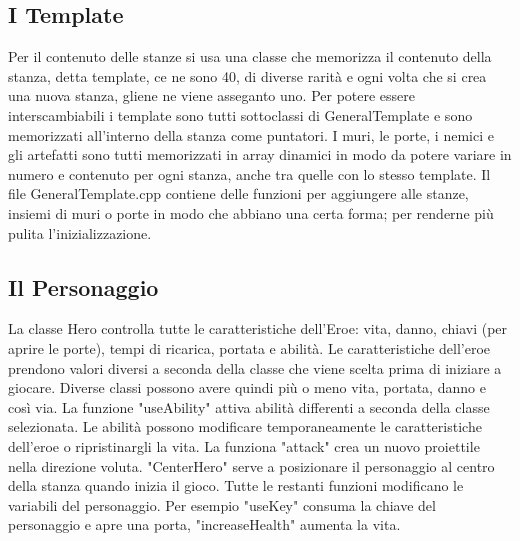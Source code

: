 \documentclass[12pt]{article}
\begin{document}
\subsection*{I Template}
Per il contenuto delle stanze si usa una classe che memorizza il contenuto della stanza, detta template, ce ne sono 40, di diverse rarità e ogni volta che si crea una nuova stanza, gliene ne viene asseganto uno. \hfill\break
Per potere essere interscambiabili i template sono tutti sottoclassi di GeneralTemplate e sono memorizzati all'interno della stanza come puntatori. \hfill\break
I muri, le porte, i nemici e gli artefatti sono tutti memorizzati in array dinamici in modo da potere variare in numero e contenuto per ogni stanza, anche tra quelle con lo stesso template.  \hfill\break
Il file GeneralTemplate.cpp contiene delle funzioni per aggiungere alle stanze, insiemi di muri o porte in modo che abbiano una certa forma; per renderne più pulita l'inizializzazione.

\subsection*{Il Personaggio}
La classe Hero controlla tutte le caratteristiche dell'Eroe: vita, danno, chiavi (per aprire le porte), tempi di ricarica, portata e abilità.
Le caratteristiche dell'eroe prendono valori diversi a seconda della classe che viene scelta prima di iniziare a giocare. Diverse classi possono avere quindi più o meno vita, portata, danno e così via.
La funzione "useAbility" attiva abilità differenti a seconda della classe selezionata.
Le abilità possono modificare temporaneamente le caratteristiche dell'eroe o ripristinargli la vita.
La funziona "attack" crea un nuovo proiettile nella direzione voluta. "CenterHero" serve a posizionare il personaggio al centro della stanza quando inizia il gioco. 
Tutte le restanti funzioni modificano le variabili del personaggio. Per esempio "useKey" consuma la chiave del personaggio e apre una porta, "increaseHealth" aumenta la vita.
\end{document}
